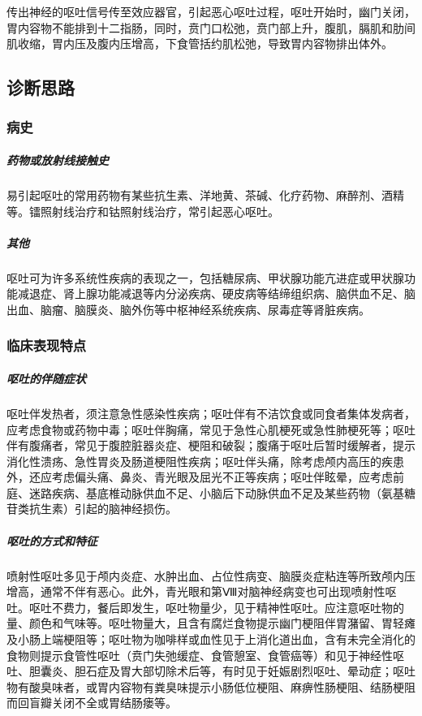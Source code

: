传出神经的呕吐信号传至效应器官，引起恶心呕吐过程，呕吐开始时，幽门关闭，胃内容物不能排到十二指肠，同时，贲门口松弛，贲门部上升，腹肌，膈肌和肋间肌收缩，胃内压及腹内压增高，下食管括约肌松弛，导致胃内容物排出体外。

\subsection{诊断思路}

\subsubsection{病史}

\subparagraph{药物或放射线接触史}

易引起呕吐的常用药物有某些抗生素、洋地黄、茶碱、化疗药物、麻醉剂、酒精等。镭照射线治疗和钴照射线治疗，常引起恶心呕吐。

\subparagraph{其他}

呕吐可为许多系统性疾病的表现之一，包括糖尿病、甲状腺功能亢进症或甲状腺功能减退症、肾上腺功能减退等内分泌疾病、硬皮病等结缔组织病、脑供血不足、脑出血、脑瘤、脑膜炎、脑外伤等中枢神经系统疾病、尿毒症等肾脏疾病。

\subsubsection{临床表现特点}

\subparagraph{呕吐的伴随症状}

呕吐伴发热者，须注意急性感染性疾病；呕吐伴有不洁饮食或同食者集体发病者，应考虑食物或药物中毒；呕吐伴胸痛，常见于急性心肌梗死或急性肺梗死等；呕吐伴有腹痛者，常见于腹腔脏器炎症、梗阻和破裂；腹痛于呕吐后暂时缓解者，提示消化性溃疡、急性胃炎及肠道梗阻性疾病；呕吐伴头痛，除考虑颅内高压的疾患外，还应考虑偏头痛、鼻炎、青光眼及屈光不正等疾病；呕吐伴眩晕，应考虑前庭、迷路疾病、基底椎动脉供血不足、小脑后下动脉供血不足及某些药物（氨基糖苷类抗生素）引起的脑神经损伤。

\subparagraph{呕吐的方式和特征}

喷射性呕吐多见于颅内炎症、水肿出血、占位性病变、脑膜炎症粘连等所致颅内压增高，通常不伴有恶心。此外，青光眼和第Ⅷ对脑神经病变也可出现喷射性呕吐。呕吐不费力，餐后即发生，呕吐物量少，见于精神性呕吐。应注意呕吐物的量、颜色和气味等。呕吐物量大，且含有腐烂食物提示幽门梗阻伴胃潴留、胃轻瘫及小肠上端梗阻等；呕吐物为咖啡样或血性见于上消化道出血，含有未完全消化的食物则提示食管性呕吐（贲门失弛缓症、食管憩室、食管癌等）和见于神经性呕吐、胆囊炎、胆石症及胃大部切除术后等，有时见于妊娠剧烈呕吐、晕动症；呕吐物有酸臭味者，或胃内容物有粪臭味提示小肠低位梗阻、麻痹性肠梗阻、结肠梗阻而回盲瓣关闭不全或胃结肠瘘等。

